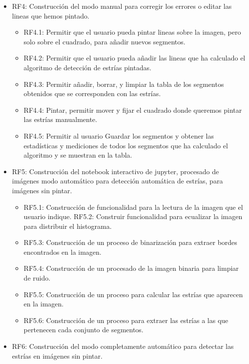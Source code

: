 \begin{itemize}
\item RF4: Construcción del modo manual para corregir los errores o editar las lineas que hemos pintado.
	\begin{itemize}
		\item RF4.1: Permitir que el usuario pueda pintar lineas sobre la imagen, pero solo sobre el cuadrado, para añadir nuevos segmentos.
		\item RF4.2: Permitir que el usuario pueda añadir las lineas que ha calculado el algoritmo de detección de estrías pintadas.
		\item RF4.3: Permitir añadir, borrar, y limpiar la tabla de los segmentos obtenidos que se corresponden con las estrías.
		\item RF4.4: Pintar, permitir mover y fijar el cuadrado donde queremos pintar las estrías manualmente.
		\item RF4.5: Permitir al usuario Guardar los segmentos y obtener las estadísticas y mediciones de todos los segmentos que ha calculado el algoritmo y se muestran en la tabla.			
	\end{itemize}

\item RF5: Construcción del notebook interactivo de jupyter, procesado de imágenes modo automático para detección automática de estrías, para imágenes sin pintar.
	\begin{itemize}
		\item RF5.1: Construcción de funcionalidad para la lectura de la imagen que el usuario indique.
			 RF5.2: Construir funcionalidad para ecualizar la imagen para distribuir el histograma.			 
		\item RF5.3: Construcción de un proceso de binarización para extraer bordes encontrados en la imagen.
		\item RF5.4: Construcción de un procesado de la imagen binaria para limpiar de ruido.
		\item RF5.5: Construcción de un proceso para calcular las estrías que aparecen en la imagen.
		\item RF5.6: Construcción de un proceso para extraer las estrías a las que pertenecen cada conjunto de segmentos.		

	\end{itemize}

			 
\item RF6: Construcción del modo completamente automático para detectar las estrías en imágenes sin pintar.
	\begin{itemize}


\end{itemize}
\end{itemize}
